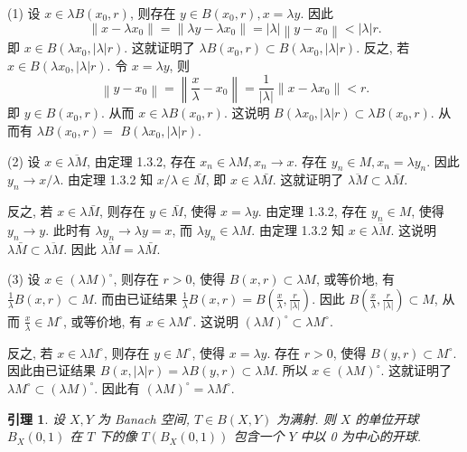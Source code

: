 \documentclass[openany]{ctexbook}
\makeatletter
\theoremstyle{kaiti}
\newtheorem{lemma}{引理}[section]
\theoremstyle{normal}
\renewenvironment{proof}[1][\proofname]{\par
    \pushQED{\qed}%
    \normalfont \topsep6\p@\@plus6\p@\relax
    \trivlist
    \item\relax
    {\heiti #1}\hspace{2\labelsep}\ignorespaces
  }{%
    \popQED\endtrivlist\@endpefalse
  }
\makeatother
\begin{document}
\begin{proof}
(1) 设 $x \in \lambda B\left(x_0, r\right)$, 则存在 $y \in B\left(x_0, r\right), x=\lambda y$. 因此
$$
\left\|x-\lambda x_0\right\|=\left\|\lambda y-\lambda x_0\right\|=|\lambda|\left\|y-x_0\right\|<|\lambda| r.
$$
即 $x \in B\left(\lambda x_0,|\lambda| r\right)$. 这就证明了 $\lambda B\left(x_0, r\right) \subset B\left(\lambda x_0,|\lambda| r\right)$.
反之, 若 $x \in B\left(\lambda x_0,|\lambda| r\right)$. 令 $x=\lambda y$, 则
$$
\left\|y-x_0\right\|=\left\|\frac{x}{\lambda}-x_0\right\|=\frac{1}{|\lambda|}\left\|x-\lambda x_0\right\|<r.
$$
即 $y \in B\left(x_0, r\right)$. 从而 $x \in \lambda B\left(x_0, r\right)$. 这说明 $B\left(\lambda x_0,|\lambda| r\right) \subset \lambda B\left(x_0, r\right)$. 从而有 $\lambda B\left(x_0, r\right)=$ $B\left(\lambda x_0,|\lambda| r\right)$.

(2) 设 $x \in \overline{\lambda M}$, 由定理 1.3.2, 存在 $x_n \in \lambda M, x_n \rightarrow x$. 存在 $y_n \in M, x_n=\lambda y_n$. 因此 $y_n \rightarrow x / \lambda$. 由定理 1.3.2 知 $x / \lambda \in \bar{M}$, 即 $x \in \lambda \bar{M}$. 这就证明了 $\overline{\lambda M} \subset \lambda \bar{M}$.

反之, 若 $x \in \lambda \bar{M}$, 则存在 $y \in \bar{M}$, 使得 $x=\lambda y$. 由定理 1.3.2, 存在 $y_n \in M$, 使得 $y_n \rightarrow y$. 此时有 $\lambda y_n \rightarrow \lambda y=x$, 而 $\lambda y_n \in \lambda M$. 由定理 1.3.2 知 $x \in \overline{\lambda M}$. 这说明 $\lambda \bar{M} \subset \overline{\lambda M}$. 因此 $\overline{\lambda M}=\lambda \bar{M}$.

(3) 设 $x \in(\lambda M)^{\circ}$, 则存在 $r>0$, 使得 $B(x, r) \subset \lambda M$, 或等价地, 有 $\frac{1}{\lambda} B(x, r) \subset M$. 而由已证结果 $\frac{1}{\lambda} B(x, r)=B\left(\frac{x}{\lambda}, \frac{r}{|\lambda|}\right)$. 因此 $B\left(\frac{x}{\lambda}, \frac{r}{|\lambda|}\right) \subset M$, 从而 $\frac{x}{\lambda} \in M^{\circ}$, 或等价地, 有 $x \in \lambda M^{\circ}$. 这说明 $(\lambda M)^{\circ} \subset \lambda M^{\circ}$.

反之, 若 $x \in \lambda M^{\circ}$, 则存在 $y \in M^{\circ}$, 使得 $x=\lambda y$. 存在 $r>0$, 使得 $B(y, r) \subset M^{\circ}$. 因此由已证结果 $B(x,|\lambda| r)=\lambda B(y, r) \subset \lambda M$. 所以 $x \in(\lambda M)^{\circ}$. 这就证明了 $\lambda M^{\circ} \subset(\lambda M)^{\circ}$. 因此有 $(\lambda M)^{\circ}=\lambda M^{\circ}$.
\end{proof}

\begin{lemma}
设 $X, Y$ 为 Banach 空间, $T \in B(X, Y)$ 为满射. 则 $X$ 的单位开球 $B_{X}(0,1)$ 在 $T$ 下的像 $T\left(B_{X}(0,1)\right)$ 包含一个 $Y$ 中以 0 为中心的开球.
\end{lemma}
\end{document}
